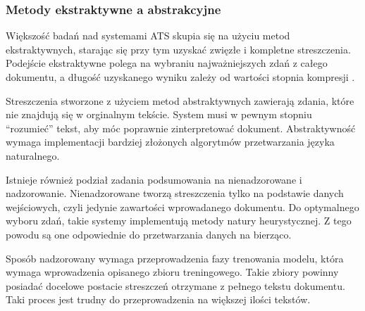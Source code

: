 \documentclass[12pt,a4paper,twoside]{article}
\begin{document}
\subsubsection{Metody ekstraktywne a abstrakcyjne}
Większość badań nad systemami ATS skupia się na użyciu metod ekstraktywnych, starając się przy tym uzyskać zwięzłe i kompletne streszczenia. Podejście ekstraktywne polega na wybraniu najważniejszych zdań z całego dokumentu, a długość uzyskanego wyniku zależy od wartości stopnia kompresji \cite{Gambhir2017}. \par
Streszczenia stworzone z użyciem metod abstraktywnych zawierają zdania, które nie znajdują się w orginalnym tekście. System musi w pewnym stopniu ``rozumieć'' tekst, aby móc poprawnie zinterpretować dokument. Abstraktywność wymaga implementacji bardziej złożonych algorytmów przetwarzania języka naturalnego.\par
Istnieje również podział zadania podsumowania na nienadzorowane i nadzorowanie. Nienadzorowane tworzą streszczenia tylko na podstawie danych wejściowych, czyli jedynie zawartości wprowadanego dokumentu. Do optymalnego wyboru zdań, takie systemy implementują metody natury heurystycznej. Z tego powodu są one odpowiednie do przetwarzania danych na bierząco.\par
Sposób nadzorowany wymaga przeprowadzenia fazy trenowania modelu, która wymaga wprowadzenia opisanego zbioru treningowego. Takie zbiory powinny posiadać docelowe postacie streszczeń otrzymane z pełnego tekstu dokumentu. Taki proces jest trudny do przeprowadzenia na większej ilości tekstów.
\end{document}
